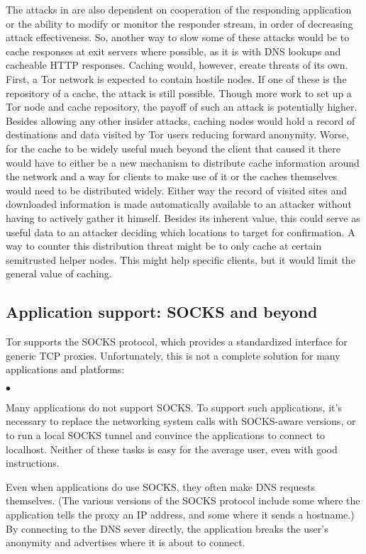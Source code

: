 \documentclass{llncs}
\newenvironment{tightlist}{\begin{list}{$\bullet$}{
  \setlength{\itemsep}{0mm}
    \setlength{\parsep}{0mm}
    }}{\end{list}}
\begin{document}
The attacks in \cite{attack-tor-oak05} are also dependent on
cooperation of the responding application or the ability to modify or
monitor the responder stream, in order of decreasing attack
effectiveness.  So, another way to slow some of these attacks
would be to cache responses at exit servers where possible, as it is with
DNS lookups and cacheable HTTP responses.  Caching would, however,
create threats of its own. First, a Tor network is expected to contain
hostile nodes. If one of these is the repository of a cache, the
attack is still possible. Though more work to set up a Tor node and
cache repository, the payoff of such an attack is potentially
higher.
%
Besides allowing any other insider attacks, caching nodes would hold a
record of destinations and data visited by Tor users reducing forward
anonymity. Worse, for the cache to be widely useful much beyond the
client that caused it there would have to either be a new mechanism to
distribute cache information around the network and a way for clients
to make use of it or the caches themselves would need to be
distributed widely. Either way the record of visited sites and
downloaded information is made automatically available to an attacker
without having to actively gather it himself.  Besides its inherent
value, this could serve as useful data to an attacker deciding which
locations to target for confirmation. A way to counter this
distribution threat might be to only cache at certain semitrusted
helper nodes.  This might help specific clients, but it would limit
the general value of caching.


\subsection{Application support: SOCKS and beyond}

Tor supports the SOCKS protocol, which provides a standardized interface for
generic TCP proxies.  Unfortunately, this is not a complete solution for
many applications and platforms:
\begin{tightlist}
\item Many applications do not support SOCKS. To support such applications,
  it's necessary to replace the networking system calls with SOCKS-aware
  versions, or to run a local SOCKS tunnel and convince the applications to
  connect to localhost.  Neither of these tasks is easy for the average user,
  even with good instructions.
\item Even when applications do use SOCKS, they often make DNS requests
  themselves.  (The various versions of the SOCKS protocol include some where
  the application tells the proxy an IP address, and some where it sends a
  hostname.)  By connecting to the DNS sever directly, the application breaks
  the user's anonymity and advertises where it is about to connect.
\end{tightlist}
\end{document}
